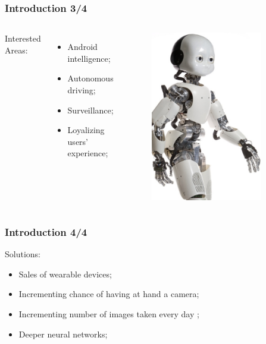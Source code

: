 \documentclass{beamer}
\begin{document}
\begin{frame}
\frametitle{Introduction 3/4}
\begin{columns}
Interested Areas:
\begin{itemize}
\item Android intelligence;
\item Autonomous driving;
\item Surveillance;
\item Loyalizing users' experience;
\end{itemize}
\begin{figure}
\includegraphics[width=0.85\textwidth]{schemi/icub}
\end{figure}
\end{columns}
\end{frame}

\begin{frame}
\frametitle{Introduction 4/4}
Solutions:
\begin{itemize}
\item Sales of wearable devices;
\item Incrementing chance of having at hand a camera;
\item Incrementing number of images taken every day \cite{photos};
\item Deeper neural networks;
\end{itemize}
\end{frame}
         
\end{document}
